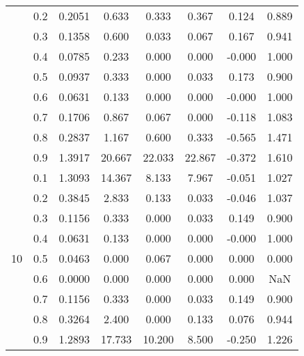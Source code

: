\documentclass[11pt,a4paper]{report}
\begin{document}
\begin{longtable}{ | c | c || c | c | c | c | c | c | }
 & 0.2 & 0.2051 & 0.633 & 0.333 & 0.367 & 0.124 & 0.889 \\
 & 0.3 & 0.1358 & 0.600 & 0.033 & 0.067 & 0.167 & 0.941 \\
 & 0.4 & 0.0785 & 0.233 & 0.000 & 0.000 & -0.000 & 1.000 \\
 & 0.5 & 0.0937 & 0.333 & 0.000 & 0.033 & 0.173 & 0.900 \\
 & 0.6 & 0.0631 & 0.133 & 0.000 & 0.000 & -0.000 & 1.000 \\
 & 0.7 & 0.1706 & 0.867 & 0.067 & 0.000 & -0.118 & 1.083 \\
 & 0.8 & 0.2837 & 1.167 & 0.600 & 0.333 & -0.565 & 1.471 \\
 & 0.9 & 1.3917 & 20.667 & 22.033 & 22.867 & -0.372 & 1.610 \\
 \hline
\multirow{9}{*}{10} & 0.1 & 1.3093 & 14.367 & 8.133 & 7.967 & -0.051 & 1.027 \\
 & 0.2 & 0.3845 & 2.833 & 0.133 & 0.033 & -0.046 & 1.037 \\
 & 0.3 & 0.1156 & 0.333 & 0.000 & 0.033 & 0.149 & 0.900 \\
 & 0.4 & 0.0631 & 0.133 & 0.000 & 0.000 & -0.000 & 1.000 \\
 & 0.5 & 0.0463 & 0.000 & 0.067 & 0.000 & 0.000 & 0.000 \\
 & 0.6 & 0.0000 & 0.000 & 0.000 & 0.000 & 0.000 & NaN \\
 & 0.7 & 0.1156 & 0.333 & 0.000 & 0.033 & 0.149 & 0.900 \\
 & 0.8 & 0.3264 & 2.400 & 0.000 & 0.133 & 0.076 & 0.944 \\
 & 0.9 & 1.2893 & 17.733 & 10.200 & 8.500 & -0.250 & 1.226 \\
 \hline
\hline
\end{longtable}
\end{document}
